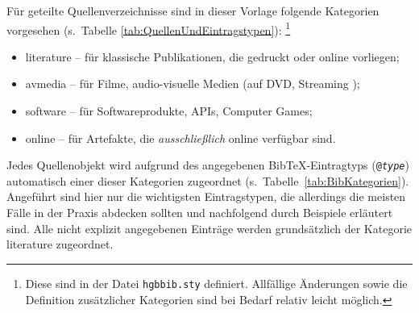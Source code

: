 Für geteilte Quellenverzeichnisse sind in dieser Vorlage folgende Kategorien vorgesehen
(s.\ Tabelle \ref{tab:QuellenUndEintragstypen}):%
\footnote{Diese sind in der Datei \nolinkurl{hgbbib.sty} definiert.
Allfällige Änderungen sowie die Definition zusätzlicher Kategorien sind 
bei Bedarf relativ leicht möglich.}
%
\begin{itemize}
	\item[] \textsf{literature} -- für klassische Publikationen, die gedruckt oder online vorliegen;
	\item[] \textsf{avmedia} -- für Filme, audio-visuelle Medien (auf DVD, Streaming \usw);
	\item[] \textsf{software} -- für Softwareprodukte, APIs, Computer Games;
	\item[] \textsf{online} -- für Artefakte, die \emph{ausschließlich} online verfügbar sind.
\end{itemize}
%
Jedes Quellenobjekt wird aufgrund des angegebenen BibTeX-Eintragtyps 
(\texttt{@\emph{type}}) automatisch einer dieser Kategorien 
zugeordnet (s.\ Tabelle~\ref{tab:BibKategorien}).
Angeführt sind hier nur die wichtigsten Eintragstypen, die allerdings die meisten
Fälle in der Praxis abdecken sollten und nachfolgend durch Beispiele erläutert sind.
Alle nicht explizit angegebenen Einträge werden grundsätzlich der Kategorie \textsf{literature} 
zugeordnet.

